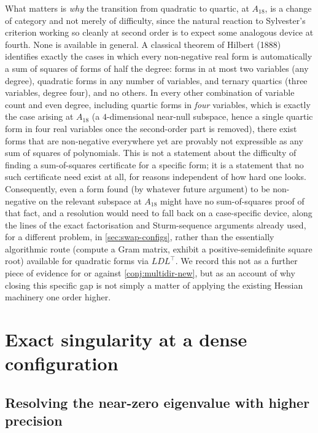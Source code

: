 \documentclass[11pt,reqno]{amsart}
\renewcommand{\_}{\origunderscore\allowbreak}
\numberwithin{equation}{section}
\theoremstyle{plain}
\theoremstyle{definition}
\theoremstyle{remark}
\begin{document}
What matters is \emph{why} the transition from quadratic
to quartic, at $A_{18}$, is a change of category and not merely of
difficulty, since the natural reaction to Sylvester's criterion working
so cleanly at second order is to expect some analogous device at fourth.
None is available in general. A classical theorem of Hilbert (1888)
identifies exactly the cases in which every non-negative real form is
automatically a sum of squares of forms of half the degree: forms in at
most two variables (any degree), quadratic forms in any number of
variables, and ternary quartics (three variables, degree four), and no
others. In every other combination of variable count and even degree,
including quartic forms in \emph{four} variables, which is exactly the
case arising at $A_{18}$ (a $4$-dimensional near-null subspace, hence a
single quartic form in four real variables once the second-order part is
removed), there exist forms that are non-negative everywhere yet are
provably not expressible as any sum of squares of polynomials. This is not
a statement about the difficulty of finding a sum-of-squares
certificate for a specific form; it is a statement that no such
certificate need exist at all, for reasons independent of how hard one
looks. Consequently, even a form found (by whatever future argument)
to be non-negative on the relevant subspace at $A_{18}$ might have no
sum-of-squares proof of that fact, and a resolution would need to fall
back on a case-specific device, along the lines of the exact
factorisation and Sturm-sequence arguments already used, for a
different problem, in \cref{sec:swap-configs}, rather than
the essentially algorithmic route (compute a Gram matrix, exhibit a
positive-semidefinite square root) available for quadratic forms via
$LDL^\top$. We record this not as a further piece of evidence for or
against \cref{conj:multidir-new}, but as an account of why closing
this specific gap is not simply a matter of applying the existing
Hessian machinery one order higher.
\section{Exact singularity at a dense configuration}\label{sec:exact-sing}

\subsection{Resolving the near-zero eigenvalue with higher precision}
\end{document}
